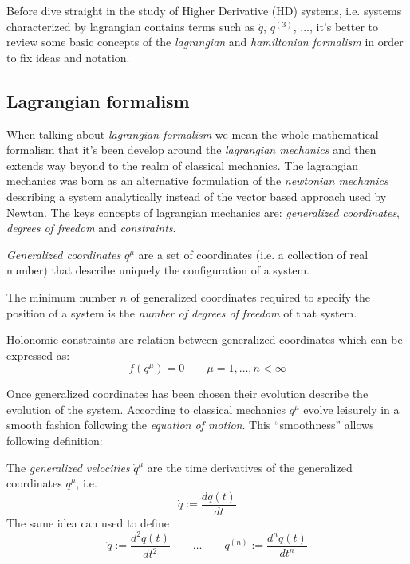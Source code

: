 Before dive straight in the study of Higher Derivative (HD) systems, i.e. systems
characterized by lagrangian contains terms such as $\ddot{q}$, ${q}^{(3)}$, ..., it's
better to review some basic concepts of the \emph{lagrangian} and \emph{hamiltonian
formalism} in order to fix ideas and notation.

\subsection{Lagrangian formalism}
When talking about \emph{lagrangian formalism} we mean the whole mathematical formalism
that it's been develop around the \emph{lagrangian mechanics} and then extends way
beyond to the realm of classical mechanics. The lagrangian mechanics was born as an
alternative formulation of the \emph{newtonian mechanics} describing a system
analytically instead of the vector based approach used by Newton. The keys concepts of
lagrangian mechanics are: \emph{generalized coordinates}, \emph{degrees of freedom} and
\emph{constraints}.
\begin{definition} \cite{Ginsberg08}
    \emph{Generalized coordinates} $q^{\mu}$ are a set of coordinates (i.e. a
    collection of real number) that describe uniquely the configuration of a system.
\end{definition}
\begin{definition} \cite{Ginsberg08}
    The minimum number $n$ of generalized coordinates required to specify the position
    of a system is the \emph{number of degrees of freedom} of that system.
\end{definition}
\begin{definition} \cite{Goldstein11_hol_constraints}
    Holonomic constraints are relation between generalized coordinates which can be
    expressed as:
    \begin{equation*}
        f(q^{\mu}) = 0 \qquad \mu = 1, \ldots, n < \infty
    \end{equation*}
\end{definition}
Once generalized coordinates has been chosen their evolution describe the evolution
of the system. According to classical mechanics $q^{\mu}$ evolve leisurely in a smooth
fashion following the \emph{equation of motion}. This ``smoothness'' allows following
definition:
\begin{definition}
    The \emph{generalized velocities} $\dot{q}^{\mu}$ are the time derivatives of the
    generalized coordinates $q^{\mu}$, i.e.
    \begin{equation*}
        \dot{q} := \frac{dq(t)}{dt}
    \end{equation*}
    The same idea can used to define
    \begin{equation*}
        \ddot{q} := \frac{d^2q(t)}{dt^2} \qquad \ldots \qquad
        q^{(n)} := \frac{d^nq(t)}{dt^n}
    \end{equation*}
\end{definition}

